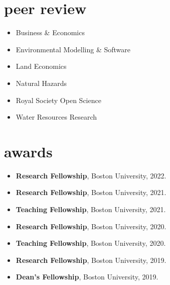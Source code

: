 \documentclass[10pt,oneside]{article}
\begin{document}

\section{peer review}

\mbox{}\vspace{-\dimexpr\baselineskip\relax}

\begin{itemize}[label={}]
  
    \item Business \& Economics
  
    \item Environmental Modelling \& Software
  
    \item Land Economics
  
    \item Natural Hazards
  
    \item Royal Society Open Science
  
    \item Water Resources Research
  
\end{itemize}


\section{awards}

\mbox{}\vspace{-\dimexpr\baselineskip\relax}

\begin{itemize}[label={}]
  
  \item \textbf{Research Fellowship}, Boston University, 2022.
        
  \item \textbf{Research Fellowship}, Boston University, 2021.
        
  \item \textbf{Teaching Fellowship}, Boston University, 2021.
        
  \item \textbf{Research Fellowship}, Boston University, 2020.
        
  \item \textbf{Teaching Fellowship}, Boston University, 2020.
        
  \item \textbf{Research Fellowship}, Boston University, 2019.
        
  \item \textbf{Dean's Fellowship}, Boston University, 2019.
        
\end{itemize}
\end{document}
